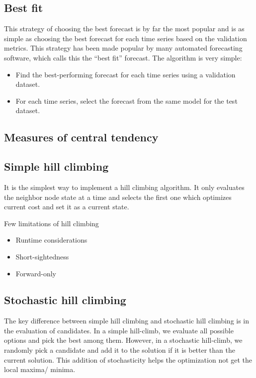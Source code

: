 \documentclass{article}
\begin{document}
\subsection{Best fit}
This strategy of choosing the best forecast is by far the most popular and is as simple as choosing the best forecast for each time series based on the validation metrics. This strategy has been made popular by many automated forecasting software, which calls this the “best fit” forecast. The algorithm is very simple:
\begin{itemize}
    \item Find the best-performing forecast for each time series using a validation dataset.  
  	\item For each time series, select the forecast from the same model for the test dataset.
\end{itemize}


\subsection{Measures of central tendency}

\subsection{Simple hill climbing}
It is the simplest way to implement a hill climbing algorithm. It only evaluates the neighbor node state at a time and selects the first one which optimizes current cost and set it as a current state.

Few limitations of hill climbing
\begin{itemize}
    \item Runtime considerations
    \item Short-sightedness
    \item Forward-only
\end{itemize}

\subsection{Stochastic hill climbing}
The key difference between simple hill climbing and stochastic hill climbing is in the evaluation of candidates. In a simple hill-climb, we evaluate all possible options and pick the best among them. However, in a stochastic hill-climb, we randomly pick a candidate and add it to the solution if it is better than the current solution. This addition of stochasticity helps the optimization not get the local maxima/ minima. 
\end{document}
